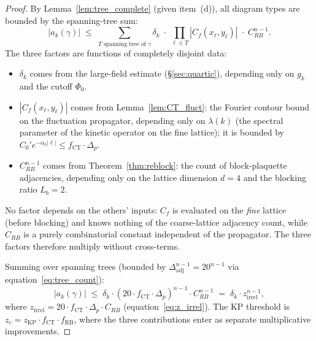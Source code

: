 \documentclass[11pt,a4paper]{amsart}
\theoremstyle{definition}
\newcommand{\Cf}{C_f}
\begin{document}
\begin{proof}
By Lemma~\ref{lem:tree_complete} (given item~(d)), all diagram types are bounded by the
spanning-tree sum:
\[
  |a_k(\gamma)| \;\le\; \sum_{T\text{ spanning tree of }\gamma}
    \delta_k \;\cdot\; \prod_{\ell\in T}|\Cf(x_\ell, y_\ell)| \;\cdot\; C_{RB}^{n-1}.
\]
The three factors are functions of completely disjoint data:
\begin{itemize}
\item $\delta_k$ comes from the large-field estimate (§\ref{sec:quartic}),
      depending only on $g_k$ and the cutoff $\Phi_0$.
\item $|\Cf(x_\ell, y_\ell)|$ comes from Lemma~\ref{lem:CT_fluct}:
      the Fourier contour bound on the fluctuation propagator, depending
      only on $\lambda(k)$ (the spectral parameter of the kinetic operator
      on the fine lattice); it is bounded by
      $C_0' e^{-\alpha_0|\ell|} \le f_{\mathrm{CT}}\cdot\Delta_p$.
\item $C_{RB}^{n-1}$ comes from Theorem~\ref{thm:reblock}: the count of
      block-plaquette adjacencies, depending only on the lattice dimension
      $d=4$ and the blocking ratio $L_b=2$.
\end{itemize}
No factor depends on the others' inputs: $\Cf$ is evaluated on the \emph{fine}
lattice (before blocking) and knows nothing of the coarse-lattice adjacency count,
while $C_{RB}$ is a purely combinatorial constant independent of the propagator.
The three factors therefore multiply without cross-terms.

Summing over spanning trees (bounded by $\Delta_{\mathrm{adj}}^{n-1} = 20^{n-1}$
via equation~\eqref{eq:tree_count}):
\[
  |a_k(\gamma)| \;\le\;
  \delta_k \cdot (20\cdot f_{\mathrm{CT}}\cdot\Delta_p)^{n-1} \cdot C_{RB}^{n-1}
  \;=\; \delta_k \cdot z_{\mathrm{irrel}}^{n-1},
\]
where $z_{\mathrm{irrel}} = 20\cdot f_{\mathrm{CT}}\cdot\Delta_p \cdot C_{RB}$
(equation~\eqref{eq:z_irrel}).  The KP threshold is
$z_c = z_{\mathrm{KP}} \cdot f_{\mathrm{CT}} \cdot f_{\mathrm{RB}}$,
where the three contributions enter as separate multiplicative improvements.
\end{proof}
\end{document}
